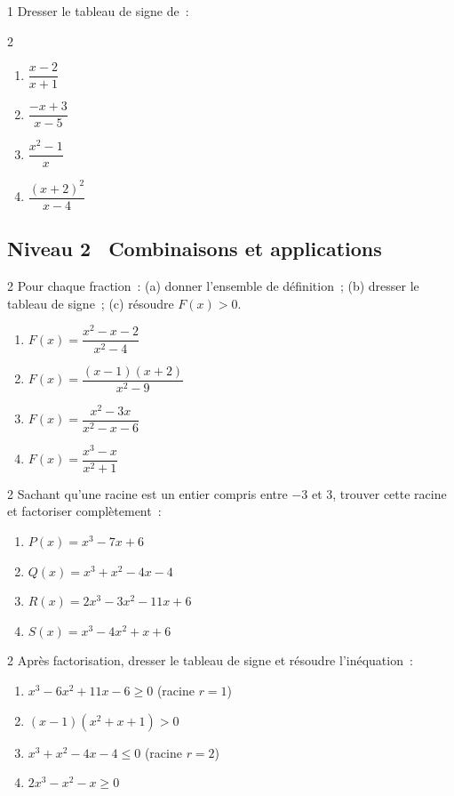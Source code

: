 \begin{exo}{1}
Dresser le tableau de signe de~:
\begin{multicols}{2}
\begin{enumerate}
  \item $\dfrac{x-2}{x+1}$
  \item $\dfrac{-x+3}{x-5}$
  \item $\dfrac{x^2-1}{x}$
  \item $\dfrac{(x+2)^2}{x-4}$
\end{enumerate}
\end{multicols}
\end{exo}

\subsection*{\quad Niveau 2 \textemdash\ Combinaisons et applications}

\begin{exo}{2}
Pour chaque fraction~: (a) donner l'ensemble de d\'efinition~; (b) dresser
le tableau de signe~; (c) r\'esoudre $F(x) > 0$.
\begin{enumerate}
  \item $F(x) = \dfrac{x^2-x-2}{x^2-4}$
  \item $F(x) = \dfrac{(x-1)(x+2)}{x^2-9}$
  \item $F(x) = \dfrac{x^2-3x}{x^2-x-6}$
  \item $F(x) = \dfrac{x^3-x}{x^2+1}$
\end{enumerate}
\end{exo}

\begin{exo}{2}
Sachant qu'une racine est un entier compris entre $-3$ et $3$, trouver
cette racine et factoriser compl\`etement~:
\begin{enumerate}
  \item $P(x) = x^3 - 7x + 6$
  \item $Q(x) = x^3 + x^2 - 4x - 4$
  \item $R(x) = 2x^3 - 3x^2 - 11x + 6$
  \item $S(x) = x^3 - 4x^2 + x + 6$
\end{enumerate}
\end{exo}

\begin{exo}{2}
Apr\`es factorisation, dresser le tableau de signe et r\'esoudre l'in\'equation~:
\begin{enumerate}
  \item $x^3 - 6x^2 + 11x - 6 \geq 0$ \quad(racine $r=1$)
  \item $(x-1)(x^2+x+1) > 0$
  \item $x^3 + x^2 - 4x - 4 \leq 0$ \quad(racine $r=2$)
  \item $2x^3 - x^2 - x \geq 0$
\end{enumerate}
\end{exo}

